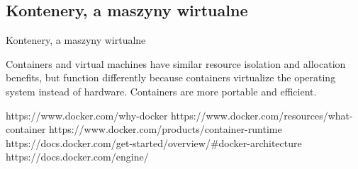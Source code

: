 \documentclass[aspectratio=169]{beamer}
\begin{document}
\subsection{Kontenery, a maszyny wirtualne}
\begin{frame}{Kontenery, a maszyny wirtualne}
    \begin{card}
        Containers and virtual machines have similar resource isolation and allocation benefits,
        but function differently because containers virtualize the operating system instead of hardware.
        Containers are more portable and efficient.
    \end{card}
\end{frame}

https://www.docker.com/why-docker
https://www.docker.com/resources/what-container
https://www.docker.com/products/container-runtime
https://docs.docker.com/get-started/overview/#docker-architecture
https://docs.docker.com/engine/
\end{document}
